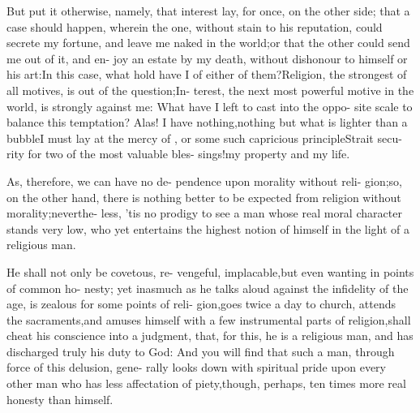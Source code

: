 \documentclass{article}
\begin{document}
\lqq But put it otherwise, namely, that\break
\lqq interest lay, for once, on the other side;\break
\lqq that a case should happen, wherein the\break
\lqq one, without stain to his reputation,\break
\lqq could secrete my fortune, and leave
\lqq me naked in the world;\tsk or that the\break
\lqq other could send me out of it, and en-\break
\lqq joy an estate by my death, without\break
\lqq dishonour to himself or his art:\tsk In\break
\lqq this case, what hold have I of either of\break
\lqq them?\tsk Religion, the strongest of all\break
\lqq motives, is out of the question;\tsk In-\break
\lqq terest, the next most powerful motive\break
\lqq in the world, is strongly against me:\tsk\break
\lqq What have I left to cast into the oppo-\break
\lqq site scale to balance this temptation?\tsk\break
\lqq Alas! I have nothing,\tsk nothing but\break
\lqq what is lighter than a bubble\tsk I must\break
\lqq lay at the mercy of , or some\break
\lqq such capricious principle\tsk Strait secu-\break
\lqq rity for two of the most valuable bles-\break
\lqq sings!\tsk my property and my life.

\lqq As, therefore, we can have no de-\break
\lqq pendence upon morality without reli-\break
\lqq gion;\tsk so, on the other hand, there is
\lqq nothing better to be expected from\break
\lqq religion without morality;\tsk neverthe-\break
\lqq less, ’tis no prodigy to see a man whose\break
\lqq real moral character stands very low,\break
\lqq who yet entertains the highest notion\break
\lqq of himself in the light of a religious\break
\lqq man.

\lqq He shall not only be covetous, re-\break
\lqq vengeful, implacable,\tsk but even\break
\lqq wanting in points of common ho-\break
\lqq nesty; yet inasmuch as he talks aloud\break
\lqq against the infidelity of the age,\tsh\break
\lqq is zealous for some points of reli-\break
\lqq gion,\tsh goes twice a day to church,\break
\lqq \tsh attends the sacraments,\tsh and\break
\lqq amuses himself with a few instrumental\break
\lqq parts of religion,\tsk shall cheat his\break
\lqq conscience into a judgment, that, for\break
\lqq this, he is a religious man, and has\break
\lqq discharged truly his duty to God:
\lqq And you will find that such a man,\break
\lqq through force of this delusion, gene-\break
\lqq rally looks down with spiritual pride\break
\lqq upon every other man who has less\break
\lqq affectation of piety,\tsk though, perhaps,\break
\lqq ten times more real honesty than\break
\lqq himself.
\end{document}
